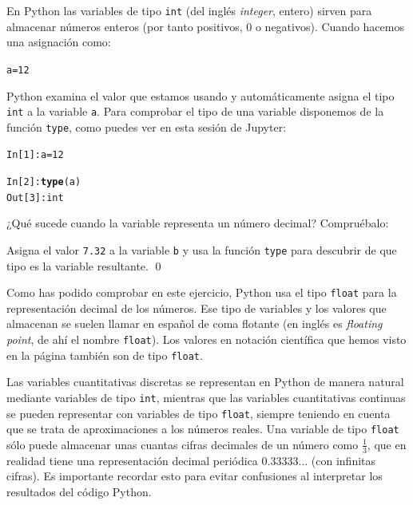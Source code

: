 \documentclass[10pt,a4paper]{article}\usepackage[]{graphicx}\usepackage[]{color}
\makeatletter
\newcommand{\hlnum}[1]{\textcolor[rgb]{0.686,0.059,0.569}{#1}}%
\newcommand{\hlopt}[1]{\textcolor[rgb]{0,0,0}{#1}}%
\newcommand{\hlstd}[1]{\textcolor[rgb]{0.345,0.345,0.345}{#1}}%
\newcommand{\hlkwb}[1]{\textcolor[rgb]{0.69,0.353,0.396}{#1}}%
\newcommand{\hlkwd}[1]{\textcolor[rgb]{0.737,0.353,0.396}{\textbf{#1}}}%
\newenvironment{kframe}{%
 \def\at@end@of@kframe{}%
 \ifinner\ifhmode%
  \def\at@end@of@kframe{\end{minipage}}%
  \begin{minipage}{\columnwidth}%
 \fi\fi%
 \def\FrameCommand##1{\hskip\@totalleftmargin \hskip-\fboxsep
 \colorbox{shadecolor}{##1}\hskip-\fboxsep
     \hskip-\linewidth \hskip-\@totalleftmargin \hskip\columnwidth}%
 \MakeFramed {\advance\hsize-\width
   \@totalleftmargin\z@ \linewidth\hsize
   \@setminipage}}%
 {\par\unskip\endMakeFramed%
 \at@end@of@kframe}
\newenvironment{knitrout}{}{} %
\newcounter {cont01}
\makeatother
\begin{document}
En Python las variables de tipo {\tt int} (del inglés {\em integer}, entero) sirven para almacenar números enteros (por tanto positivos, 0 o negativos). Cuando hacemos una asignación como:
\begin{knitrout}
\color{fgcolor}\begin{kframe}
\begin{alltt}
\hlstd{a} \hlkwb{=} \hlnum{12}
\end{alltt}
\end{kframe}
\end{knitrout}
Python examina el valor que estamos usando y automáticamente asigna el tipo {\tt int} a la variable {\tt a}. Para comprobar el tipo de una variable disponemos de la función {\tt type}, como puedes ver en esta sesión de Jupyter:
\begin{knitrout}
\color{fgcolor}\begin{kframe}
\begin{alltt}
\hlstd{In [}\hlnum{1}\hlstd{]}\hlopt{:} \hlstd{a} \hlkwb{=} \hlnum{12}

\hlstd{In [}\hlnum{2}\hlstd{]}\hlopt{:} \hlkwd{type}\hlstd{(a)}
\hlstd{Out[}\hlnum{3}\hlstd{]}\hlopt{:} \hlstd{int}
\end{alltt}
\end{kframe}
\end{knitrout}
¿Qué sucede cuando la variable representa un número decimal? Compruébalo:

\begin{ejercicio}
\label{tut02:ejercicio10}
Asigna el valor {\tt 7.32} a la variable {\tt b} y usa la función {\tt type} para descubrir de que tipo es la variable resultante.
\qed
\end{ejercicio}
Como has podido comprobar en este ejercicio, Python usa el tipo {\tt float} para la representación decimal de los números. Ese tipo de variables y los valores que almacenan se suelen llamar en español de {\sf coma flotante} (en inglés es {\em floating point}, de ahí el nombre {\tt float}). Los valores en notación científica que hemos visto en la página \pageref{tut02:subsubsec:notacionCientifica} también son de tipo {\tt float}.

Las variables cuantitativas discretas se representan en Python de manera natural mediante variables de tipo {\tt int}, mientras que las variables cuantitativas continuas se pueden representar con variables de tipo {\tt float}, siempre teniendo en cuenta que se trata de aproximaciones a los números reales. Una variable de tipo {\tt float} sólo puede almacenar unas cuantas cifras decimales de un número como  $\frac{1}{3}$, que en realidad tiene una representación decimal periódica $0.33333\ldots$ (con infinitas cifras). Es importante recordar esto para evitar confusiones al interpretar los resultados del código Python.
\end{document}
